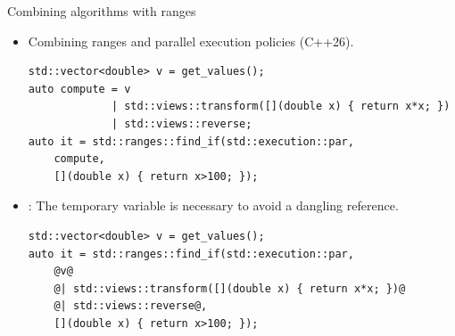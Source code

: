 \begin{frame}[t,fragile]{Combining algorithms with ranges}
\begin{itemize}

    \item Combining ranges and parallel execution policies (C++26).
\begin{lstlisting}
std::vector<double> v = get_values();
auto compute = v 
             | std::views::transform([](double x) { return x*x; })
             | std::views::reverse;
auto it = std::ranges::find_if(std::execution::par, 
    compute, 
    [](double x) { return x>100; });
\end{lstlisting}

     \item {}: The temporary variable  is necessary to avoid a dangling reference. 
\begin{lstlisting}
std::vector<double> v = get_values();
auto it = std::ranges::find_if(std::execution::par, 
    @v@
    @| std::views::transform([](double x) { return x*x; })@
    @| std::views::reverse@,
    [](double x) { return x>100; });
\end{lstlisting}

\end{itemize}
\end{frame}